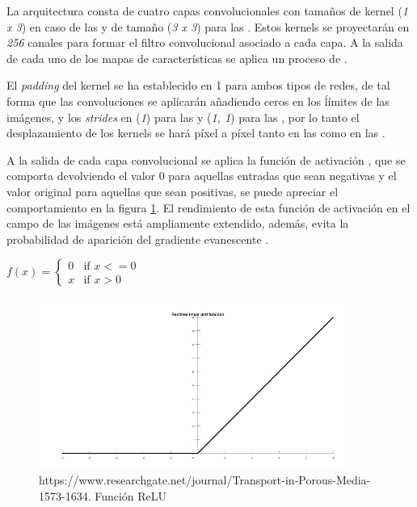 \begin{enumerate}
                La arquitectura consta de cuatro capas convolucionales con tamaños de kernel (\textit{1 x 3}) en caso de las  y de tamaño (\textit{3 x 3}) para las . Estos kernels se proyectarán en \textit{256} canales para formar el filtro convolucional asociado a cada capa. A la salida de cada uno de los mapas de características se aplica un proceso de .

                El \textit{padding} del kernel se ha establecido en 1 para ambos tipos de redes, de tal forma que las convoluciones se aplícarán añadiendo ceros en los ĺímites de las imágenes, y los \textit{strides} en (\textit{1}) para las  y (\textit{1, 1}) para las , por lo tanto el desplazamiento de los kernels se hará píxel a píxel tanto en las  como en las .

                A la salida de cada capa convolucional se aplica la función de activación , que se comporta devolviendo el valor $0$ para aquellas entradas que sean negativas y el valor original para aquellas que sean positivas, se puede apreciar el comportamiento en la figura \ref{RELUImage}. El rendimiento de esta función de activación en el campo de las imágenes está ampliamente extendido, además, evita la probabilidad de aparición del gradiente evanescente \cite{GradientVanishingRelu}.

                \begin{center}
                    $f(x) = \left\{
                                   \begin{array}{lr}
                                     0 & \text{if } x<=0\\
                                     x & \text{if } x>0
                                   \end{array}
                            \right.$
                \end{center}

                \begin{figure}[h]
                    \centering
                    \includegraphics[width=10cm]{archivos/CNN/RELUImage}
                    \caption{https://www.researchgate.net/journal/Transport-in-Porous-Media-1573-1634. Función ReLU}
                    \label{RELUImage}
                 \end{figure}


\end{enumerate}
